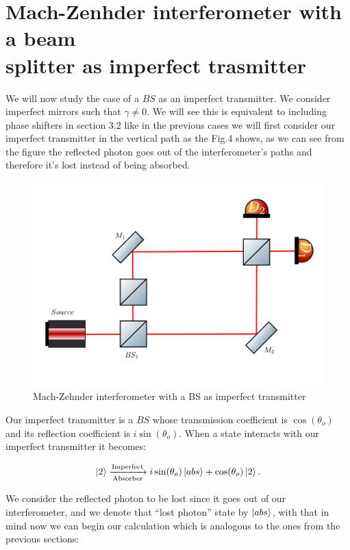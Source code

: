 \documentclass[12pt]{book}
\begin{document}
\pagebreak


\section{Mach-Zenhder interferometer with a beam \\ splitter as imperfect trasmitter}

We will now study the case of a $BS$ as an imperfect transmitter. We consider imperfect mirrors such that $\gamma \neq 0$. We will see this is equivalent to including phase shifters in section 3.2 like in the previous cases we will first consider our imperfect transmitter in the vertical path as the Fig.4 shows, as we can see from the figure the reflected photon goes out of the interferometer's paths and therefore it's lost instead of being absorbed.

\begin{figure}[h!]
\centering
\includegraphics[width=\linewidth,height=7.5 cm]{images/machzenhderbs.png}
\caption{Mach-Zehnder interferometer with a BS as imperfect transmitter}
\label{fig:BS2}
\end{figure}

Our imperfect transmitter is a $BS$ whose transmission coefficient is $\cos(\theta_{o})$ and its reflection coefficient is $i\sin(\theta_{o})$. When a state interacts with our imperfect transmitter it becomes:

\begin{align}
\ket{2}\xrightarrow[\text{Absorber}]{\text{Imperfect}}i\sin(\theta_{o}) \ket{abs} +\cos(\theta_{o}) \ket{2}.
\end{align}

We consider the reflected photon to be lost since it goes out of our interferometer, and we denote that ``lost photon'' state by $\ket{abs}$, with that in mind now we can begin our calculation which is analogous to the ones from the previous sections:
\end{document}
